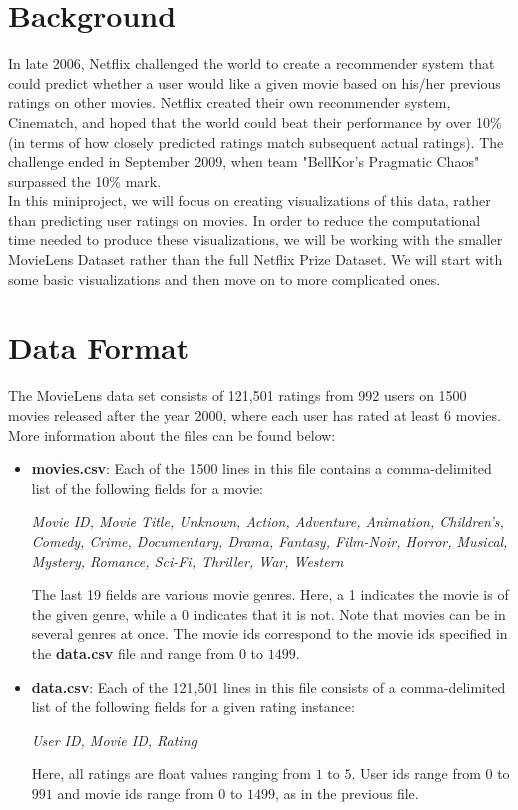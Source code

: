 \section{Background}
In late 2006, Netflix challenged the world to create a recommender system that could predict whether a user would like a given movie based on his/her previous ratings on other movies. Netflix created their own recommender system, Cinematch, and hoped that the world could beat their performance by over 10\% (in terms of how closely predicted ratings match subsequent actual ratings). The challenge ended in September 2009, when team "BellKor's Pragmatic Chaos" surpassed the 10\% mark. \\

In this miniproject, we will focus on creating visualizations of this data, rather than predicting user ratings on movies. In order to reduce the computational time needed to produce these visualizations, we will be working with the smaller MovieLens Dataset rather than the full Netflix Prize Dataset. We will start with some basic visualizations and then move on to more complicated ones.

\section{Data Format}
The MovieLens data set consists of 121,501 ratings from 992 users on 1500 movies released after the year 2000, where each user has rated at least 6 movies. More information about the files can be found below:

\begin{itemize}
	\item \textbf{movies.csv}: Each of the 1500 lines in this file contains a comma-delimited list of the following fields for a movie:
		\begin{center}
		\textit{Movie ID, Movie Title, Unknown, Action, Adventure, Animation, Children’s, Comedy, Crime, Documentary, Drama, Fantasy, Film-Noir, Horror, Musical, Mystery, Romance, Sci-Fi, Thriller, War, Western}
		\end{center}
The last 19 fields are various movie genres. Here, a 1 indicates the movie is of the given genre, while a 0 indicates that it is not. Note that movies can be in several genres at once. The movie ids correspond to the movie ids specified in the \textbf{data.csv} file and range from $0$ to $1499$.
	\item \textbf{data.csv}: Each of the 121,501 lines in this file consists of a comma-delimited list of the following fields for a given rating instance:
		\begin{center}
		\textit{User ID, Movie ID, Rating}
		\end{center}
Here, all ratings are float values ranging from $1$ to $5$. User ids range from $0$ to $991$ and movie ids range from $0$ to $1499$, as in the previous file.
\end{itemize}

